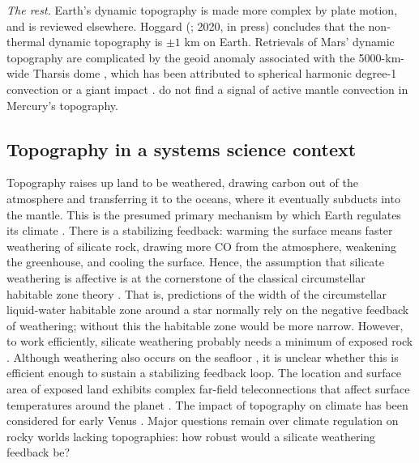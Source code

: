 






\vspace{0.5cm}

\textit{\color{teal1} The rest.} Earth's dynamic topography is made more complex by plate motion, and is reviewed elsewhere. Hoggard (\citeyear{Hoggard2016}; 2020, in press) concludes that the non-thermal dynamic topography is $\pm1$ km on Earth. Retrievals of Mars' dynamic topography are complicated by the geoid anomaly associated with the 5000-km-wide Tharsis dome \citep{Phillips2001, Wieczorek2004}, which has been attributed to spherical harmonic degree-1 convection \citep{Zhong2001} or a giant impact \citep{Reese2006, Andrews-Hanna2008}. \citet{James2014} do not find a signal of active mantle convection in Mercury's topography. 	





\subsection{Topography in a systems science context}

Topography raises up land to be weathered, drawing carbon out of the atmosphere and transferring it to the oceans, where it eventually subducts into the mantle. This is the presumed primary mechanism by which Earth regulates its climate \citep{Walker1981}. There is a stabilizing feedback: warming the surface means faster weathering of silicate rock, drawing more CO from the atmosphere, weakening the greenhouse, and cooling the surface. Hence, the assumption that silicate weathering is affective is at the cornerstone of the classical circumstellar habitable zone theory \citep{Kasting1993}. That is, predictions of the width of the circumstellar liquid-water habitable zone around a star normally rely on the negative feedback of weathering; without this the habitable zone would be more narrow. However, to work efficiently, silicate weathering probably needs a minimum of exposed rock \citep{Abbot2012}. Although weathering also occurs on the seafloor \citep{Krissansen-Totton2017}, it is unclear whether this is efficient enough to sustain a stabilizing feedback loop. The location and surface area of exposed land exhibits complex far-field teleconnections that affect surface temperatures around the planet \citep{Sohl2017}. The impact of topography on climate has been considered for early Venus \citep{Way2016}. Major questions remain over climate regulation on rocky worlds lacking topographies: how robust would a silicate weathering feedback be? 

